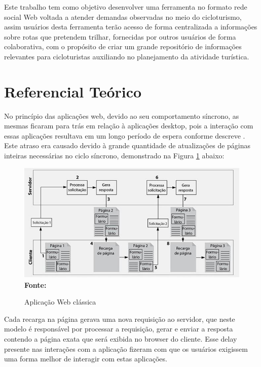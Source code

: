 Este trabalho tem como objetivo desenvolver uma ferramenta no formato rede social Web voltada a atender demandas observadas no meio do cicloturismo,
assim usuários desta ferramenta terão acesso de forma centralizada a informações sobre rotas que pretendem trilhar, fornecidas por outros usuários
de forma colaborativa, com o propósito de criar um grande repositório de informações relevantes para cicloturistas auxiliando no planejamento da 
atividade turística.

\section{\esp Referencial Teórico}
No princípio das aplicações web, devido ao seu comportamento síncrono, as mesmas ficaram para trás em relação à aplicações desktop, pois a interação 
com essas aplicações resultava em um longo período de espera conforme descreve \cite{deitelAjax}. Este atraso era causado devido à grande quantidade 
de atualizações de páginas inteiras necessárias no ciclo síncrono, demonstrado na Figura \ref{fig:arquitetura_web_tradicional} abaixo: 

\begin{figure}[!ht]
	\centering	
	\caption[\hspace{0.1cm}Aplicação Web clássica.]{Aplicação Web clássica}
	  \vspace{-0.4cm}
	\includegraphics[width=.8\textwidth]{figuras/arquitetura_web_tradicional.png}
	 \vspace{-0.3cm}
	\\\textbf{\footnotesize Fonte: \cite{deitelAjax}}
	\label{fig:arquitetura_web_tradicional}
\end{figure}

Cada recarga na página gerava uma nova requisição ao servidor, que neste modelo é responsável por processar a requisição, gerar e enviar a resposta 
contendo a página exata que será exibida no browser do cliente. Esse delay presente nas interações com a aplicação fizeram com que os usuários 
exigissem uma forma melhor de interagir com estas aplicações. 

